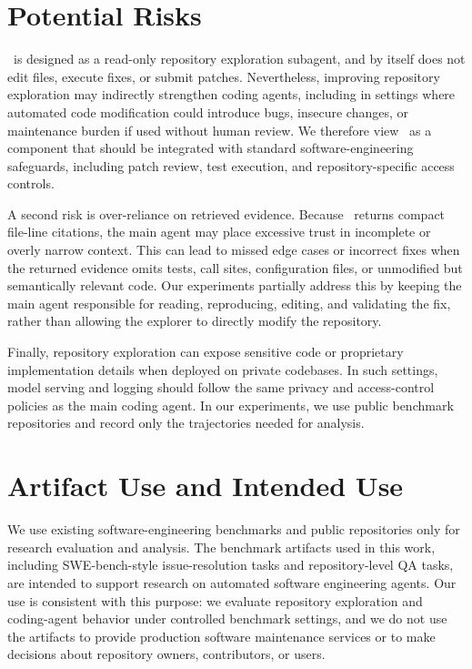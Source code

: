 \documentclass{llmxive}
\providecommand{\approach}{~}
\begin{document}
\section{Potential Risks}

\approach is designed as a read-only repository exploration subagent, and by itself does not edit files, execute fixes, or submit patches. Nevertheless, improving repository exploration may indirectly strengthen coding agents, including in settings where automated code modification could introduce bugs, insecure changes, or maintenance burden if used without human review. We therefore view \approach as a component that should be integrated with standard software-engineering safeguards, including patch review, test execution, and repository-specific access controls.

A second risk is over-reliance on retrieved evidence. Because \approach returns compact file-line citations, the main agent may place excessive trust in incomplete or overly narrow context. This can lead to missed edge cases or incorrect fixes when the returned evidence omits tests, call sites, configuration files, or unmodified but semantically relevant code. Our experiments partially address this by keeping the main agent responsible for reading, reproducing, editing, and validating the fix, rather than allowing the explorer to directly modify the repository.

Finally, repository exploration can expose sensitive code or proprietary implementation details when deployed on private codebases. In such settings, model serving and logging should follow the same privacy and access-control policies as the main coding agent. In our experiments, we use public benchmark repositories and record only the trajectories needed for analysis.

\section{Artifact Use and Intended Use}

We use existing software-engineering benchmarks and public repositories only for research evaluation and analysis. The benchmark artifacts used in this work, including SWE-bench-style issue-resolution tasks and repository-level QA tasks, are intended to support research on automated software engineering agents. Our use is consistent with this purpose: we evaluate repository exploration and coding-agent behavior under controlled benchmark settings, and we do not use the artifacts to provide production software maintenance services or to make decisions about repository owners, contributors, or users.
\end{document}
